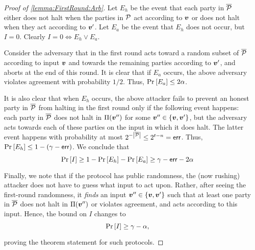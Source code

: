 \begin{proof}[Proof of \cref{lemma:FirstRound:Arb}]
Let $E_h$ be the event that each party in ${\overline{\mathcal{P}}}$ either does not halt when the parties in $\mathcal{P}$ act according to ${ \boldsymbol{v}}$ or does not halt when they act according to ${ \boldsymbol{v}}'$. Let $E_a$ be the event that $E_h$ does not occur, but $I = 0$. Clearly $I = 0 \Longleftrightarrow E_h \lor E_a$.

Consider the adversary that in the first round acts toward a random subset of ${\overline{\mathcal{P}}}$ according to input ${ \boldsymbol{v}}$ and towards the remaining parties according to ${ \boldsymbol{v}}'$, and aborts at the end of this round. It is clear that if $E_a$ occurs, the above adversary violates agreement with probability $1/2$. Thus, $\Pr_{}\left[E_a\right] \le 2\alpha$.

It is also clear that when $E_h$ occurs, the above attacker fails to prevent an honest party
in ${\overline{\mathcal{P}}}$ from halting in the first round only if the following event happens: each party in ${\overline{\mathcal{P}}} $ does not halt in $\Pi({ \boldsymbol{v}}'')$ for some ${ \boldsymbol{v}}'' \in \left\{{ \boldsymbol{v}},{ \boldsymbol{v}}'\right\}$, but the adversary acts towards each of these parties on the input in which it does halt. The latter event happens with probability at most $2^{-\left|{\overline{\mathcal{P}}}\right|} \le 2^{t-n} = \mathsf{err}$. Thus, $\Pr_{}\left[E_h\right] \le 1 - (\gamma - \mathsf{err})$. We conclude that
\begin{align}
	\Pr_{}\left[I\right] \ge 1 - \Pr_{}\left[E_h\right] - \Pr_{}\left[E_a\right] \ge \gamma - \mathsf{err} - 2\alpha
\end{align}
Finally, we note that if the protocol has public randomness, the (now rushing) attacker does not have to guess what input to act upon.
Rather, after seeing the first-round randomness, it \emph{finds} an input ${ \boldsymbol{v}}'' \in\left\{{ \boldsymbol{v}},{ \boldsymbol{v}}'\right\}$ such that at least one party in ${\overline{\mathcal{P}}}$ does not halt in $\Pi({ \boldsymbol{v}}'')$ or violates agreement, and acts according to this input. Hence, the bound on $I$ changes to
\begin{align*}
\Pr_{}\left[I\right] \ge \gamma - \alpha,
\end{align*}
proving the theorem statement for such protocols.
\end{proof}
